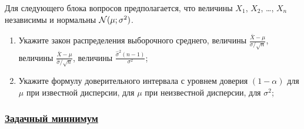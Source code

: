 Для следующего блока вопросов предполагается, что величины $X_1$, $X_2$, \ldots, $X_n$ независимы и нормальны $\mathcal{N}(\mu;\sigma^2)$.

\begin{enumerate}[resume]
  \item Укажите закон распределения выборочного среднего,
	величины $\frac{\bar X - \mu}{\sigma/\sqrt{n}}$,
	величины $\frac{\bar X - \mu}{\hat\sigma/\sqrt{n}}$,
	величины $\frac{\hat\sigma^2(n-1)}{\sigma^2}$;
  \item Укажите формулу доверительного интервала с уровнем доверия
	$(1-\alpha)$ для $\mu$ при известной дисперсии,
	для $\mu$ при неизвестной дисперсии, для $\sigma^2$;
\end{enumerate}


\newpage
\subsubsection*{\hyperref[sec:sol_minimum_kr_03]{Задачный миннимум}}
\label{sec:minimum_kr_03}

